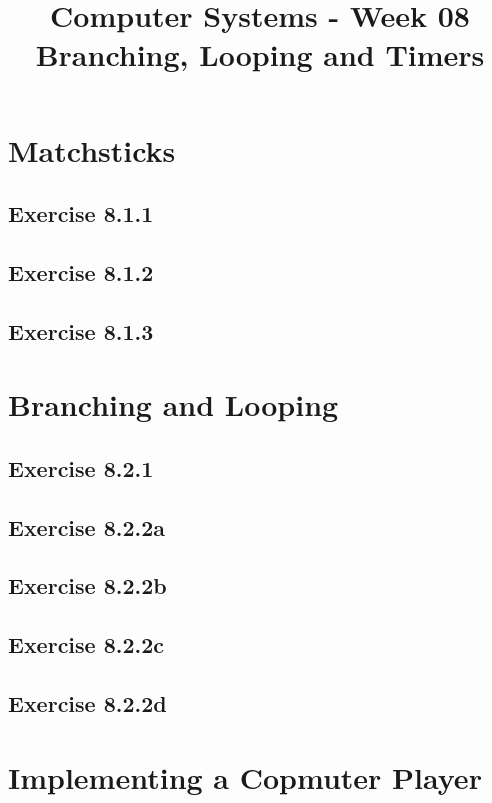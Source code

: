 \documentclass[conference]{IEEEtran}
\begin{document}
	
	\title{Computer Systems - Week 08 Branching, Looping and Timers}
	
	\author{
	}
	\maketitle
	\section{Matchsticks}
		\subsection*{Exercise 8.1.1}
		\subsection*{Exercise 8.1.2}
		\subsection*{Exercise 8.1.3}
	\section{Branching and Looping}
		\subsection*{Exercise 8.2.1}
		\subsection*{Exercise 8.2.2a}
		\subsection*{Exercise 8.2.2b}
		\subsection*{Exercise 8.2.2c}
		\subsection*{Exercise 8.2.2d}
	\section{Implementing a Copmuter Player}
\end{document}
